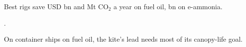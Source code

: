 \item \NumHighlightAdviceAmmonia{}
\item \NumHighlightAdviceOil{}
\item Best rigs save USD \NumFleetSavedOil{} bn and \NumFleetCarbonOil{} Mt CO$_2$ a year on fuel oil, \NumFleetSavedAmmonia{} bn on e-ammonia.
\item \NumTrailingSummary{}.
\item On container ships on fuel oil, the kite's lead needs most of its canopy-life goal.
